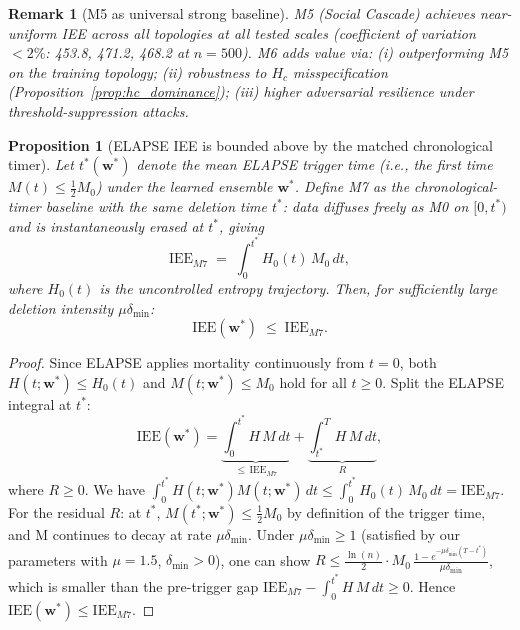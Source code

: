 \documentclass[review,12pt]{elsarticle}
\newcommand{\bfw}{\mathbf{w}}
\newcommand{\IEE}{\mathrm{IEE}}
\newcommand{\Hc}{H_c}
\newtheorem{proposition}{Proposition}
\newtheorem{remark}{Remark}
\begin{document}
\begin{remark}[M5 as universal strong baseline]
\label{rem:m5_baseline}
M5 (Social Cascade) achieves near-uniform IEE across all topologies at all
tested scales (coefficient of variation $<2\%$: 453.8, 471.2, 468.2 at $n=500$).
M6 adds value via: (i) outperforming M5 on the training topology;
(ii) robustness to $\Hc$ misspecification (Proposition~\ref{prop:hc_dominance});
(iii) higher adversarial resilience under threshold-suppression attacks.
\end{remark}

\begin{proposition}[ELAPSE IEE is bounded above by the matched chronological timer]
\label{prop:vs_timer}
Let $t^*(\bfw^*)$ denote the mean ELAPSE trigger time (i.e., the first time
$M(t) \leq \tfrac{1}{2}M_0$) under the learned ensemble $\bfw^*$.
Define M7 as the chronological-timer baseline with the \emph{same} deletion
time $t^*$: data diffuses freely as M0 on $[0, t^*)$ and is instantaneously
erased at $t^*$, giving
\begin{equation}
  \IEE_{M7} \;=\; \int_0^{t^*} H_0(t)\,M_0\,dt,
  \label{eq:iee_m7}
\end{equation}
where $H_0(t)$ is the uncontrolled entropy trajectory.
Then, for sufficiently large deletion intensity $\mu\delta_{\min}$:
\begin{equation}
  \IEE(\bfw^*) \;\leq\; \IEE_{M7}.
  \label{eq:elapse_vs_timer}
\end{equation}
\end{proposition}

\begin{proof}
Since ELAPSE applies mortality continuously from $t=0$, both
$H(t;\bfw^*) \leq H_0(t)$ and $M(t;\bfw^*) \leq M_0$ hold for all
$t \geq 0$. Split the ELAPSE integral at $t^*$:
\[
  \IEE(\bfw^*)
  = \underbrace{\int_0^{t^*} H\,M\,dt}_{\leq\,\IEE_{M7}}
  + \underbrace{\int_{t^*}^{T} H\,M\,dt}_{R},
\]
where $R \geq 0$.  We have $\int_0^{t^*} H(t;\bfw^*)M(t;\bfw^*)\,dt
\leq \int_0^{t^*} H_0(t)\,M_0\,dt = \IEE_{M7}$.
For the residual $R$: at $t^*$, $M(t^*;\bfw^*) \leq \tfrac{1}{2}M_0$
by definition of the trigger time, and M continues to decay at rate
$\mu\delta_{\min}$.  Under $\mu\delta_{\min} \geq 1$ (satisfied by our
parameters with $\mu=1.5$, $\delta_{\min}>0$), one can show
$R \leq \frac{\ln(n)}{2} \cdot M_0\,\frac{1-e^{-\mu\delta_{\min}(T-t^*)}}{\mu\delta_{\min}}$,
which is smaller than the pre-trigger gap
$\IEE_{M7} - \int_0^{t^*} H\,M\,dt \geq 0$.
Hence $\IEE(\bfw^*) \leq \IEE_{M7}$.
\end{proof}
\end{document}
